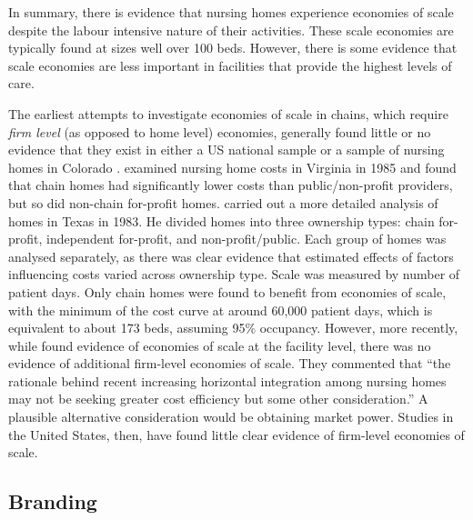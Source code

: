 \documentclass[a4paper,11pt,titlepage,british]{article}
\begin{document}
In summary, there is evidence that nursing homes experience economies of scale despite the labour intensive nature of their activities.  These scale economies are typically found at sizes well over 100 beds.  However, there is some evidence that scale economies are less important in facilities that provide the highest levels of care.

The earliest attempts to investigate economies of scale in chains, which require \emph{firm level} (as opposed to home level) economies, generally found little or no evidence that they exist in either a US national sample or a sample of nursing homes in Colorado \parencites{Birnbaum1981}{Meiners1982}{Schlenker1984}. \textcite{Arling1987} examined nursing home costs in Virginia in 1985 and found that chain homes had significantly lower costs than public/non-profit providers, but so did non-chain for-profit homes.  \textcite{McKay1991} carried out a more detailed analysis of homes in Texas in 1983.  He divided homes into three ownership types: chain for-profit, independent for-profit, and non-profit/public.  Each group of homes was analysed separately, as there was clear evidence that estimated effects of factors influencing costs varied across ownership type.  Scale was measured by number of patient days.  Only chain homes were found to benefit from economies of scale, with the minimum of the cost curve at around 60,000 patient days, which is equivalent to about 173 beds, assuming 95\% occupancy.  However, more recently, while \textcite{Chen2004} found evidence of economies of scale at the facility level, there was no evidence of additional firm-level economies of scale.  They commented that ``the rationale behind recent increasing horizontal
integration among nursing homes may not be seeking greater cost efficiency but some other consideration.''  A plausible alternative consideration would be obtaining market power.  Studies in the United States, then, have found little clear evidence of firm-level economies of scale.

\subsection{Branding}
\end{document}
